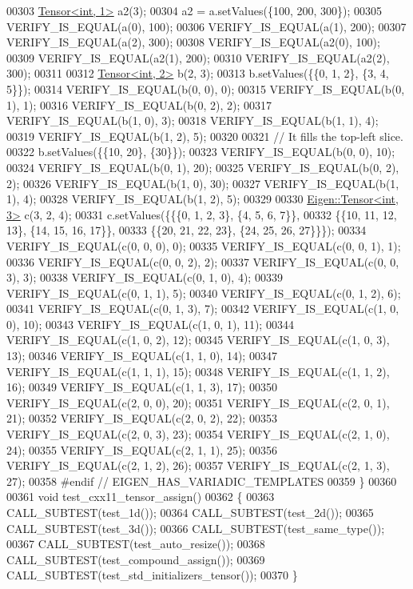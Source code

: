 \begin{DoxyCode}
00303   \hyperlink{class_eigen_1_1_tensor}{Tensor<int, 1>} a2(3);
00304   a2 = a.setValues(\{100, 200, 300\});
00305   VERIFY\_IS\_EQUAL(a(0), 100);
00306   VERIFY\_IS\_EQUAL(a(1), 200);
00307   VERIFY\_IS\_EQUAL(a(2), 300);
00308   VERIFY\_IS\_EQUAL(a2(0), 100);
00309   VERIFY\_IS\_EQUAL(a2(1), 200);
00310   VERIFY\_IS\_EQUAL(a2(2), 300);
00311 
00312   \hyperlink{class_eigen_1_1_tensor}{Tensor<int, 2>} b(2, 3);
00313   b.setValues(\{\{0, 1, 2\}, \{3, 4, 5\}\});
00314   VERIFY\_IS\_EQUAL(b(0, 0), 0);
00315   VERIFY\_IS\_EQUAL(b(0, 1), 1);
00316   VERIFY\_IS\_EQUAL(b(0, 2), 2);
00317   VERIFY\_IS\_EQUAL(b(1, 0), 3);
00318   VERIFY\_IS\_EQUAL(b(1, 1), 4);
00319   VERIFY\_IS\_EQUAL(b(1, 2), 5);
00320 
00321   \textcolor{comment}{// It fills the top-left slice.}
00322   b.setValues(\{\{10, 20\}, \{30\}\});
00323   VERIFY\_IS\_EQUAL(b(0, 0), 10);
00324   VERIFY\_IS\_EQUAL(b(0, 1), 20);
00325   VERIFY\_IS\_EQUAL(b(0, 2), 2);
00326   VERIFY\_IS\_EQUAL(b(1, 0), 30);
00327   VERIFY\_IS\_EQUAL(b(1, 1), 4);
00328   VERIFY\_IS\_EQUAL(b(1, 2), 5);
00329 
00330   \hyperlink{class_eigen_1_1_tensor}{Eigen::Tensor<int, 3>} c(3, 2, 4);
00331   c.setValues(\{\{\{0, 1, 2, 3\}, \{4, 5, 6, 7\}\},
00332                \{\{10, 11, 12, 13\}, \{14, 15, 16, 17\}\},
00333                \{\{20, 21, 22, 23\}, \{24, 25, 26, 27\}\}\});
00334   VERIFY\_IS\_EQUAL(c(0, 0, 0), 0);
00335   VERIFY\_IS\_EQUAL(c(0, 0, 1), 1);
00336   VERIFY\_IS\_EQUAL(c(0, 0, 2), 2);
00337   VERIFY\_IS\_EQUAL(c(0, 0, 3), 3);
00338   VERIFY\_IS\_EQUAL(c(0, 1, 0), 4);
00339   VERIFY\_IS\_EQUAL(c(0, 1, 1), 5);
00340   VERIFY\_IS\_EQUAL(c(0, 1, 2), 6);
00341   VERIFY\_IS\_EQUAL(c(0, 1, 3), 7);
00342   VERIFY\_IS\_EQUAL(c(1, 0, 0), 10);
00343   VERIFY\_IS\_EQUAL(c(1, 0, 1), 11);
00344   VERIFY\_IS\_EQUAL(c(1, 0, 2), 12);
00345   VERIFY\_IS\_EQUAL(c(1, 0, 3), 13);
00346   VERIFY\_IS\_EQUAL(c(1, 1, 0), 14);
00347   VERIFY\_IS\_EQUAL(c(1, 1, 1), 15);
00348   VERIFY\_IS\_EQUAL(c(1, 1, 2), 16);
00349   VERIFY\_IS\_EQUAL(c(1, 1, 3), 17);
00350   VERIFY\_IS\_EQUAL(c(2, 0, 0), 20);
00351   VERIFY\_IS\_EQUAL(c(2, 0, 1), 21);
00352   VERIFY\_IS\_EQUAL(c(2, 0, 2), 22);
00353   VERIFY\_IS\_EQUAL(c(2, 0, 3), 23);
00354   VERIFY\_IS\_EQUAL(c(2, 1, 0), 24);
00355   VERIFY\_IS\_EQUAL(c(2, 1, 1), 25);
00356   VERIFY\_IS\_EQUAL(c(2, 1, 2), 26);
00357   VERIFY\_IS\_EQUAL(c(2, 1, 3), 27);
00358 \textcolor{preprocessor}{#endif  // EIGEN\_HAS\_VARIADIC\_TEMPLATES}
00359 \}
00360 
00361 \textcolor{keywordtype}{void} test\_cxx11\_tensor\_assign()
00362 \{
00363   CALL\_SUBTEST(test\_1d());
00364   CALL\_SUBTEST(test\_2d());
00365   CALL\_SUBTEST(test\_3d());
00366   CALL\_SUBTEST(test\_same\_type());
00367   CALL\_SUBTEST(test\_auto\_resize());
00368   CALL\_SUBTEST(test\_compound\_assign());
00369   CALL\_SUBTEST(test\_std\_initializers\_tensor());
00370 \}
\end{DoxyCode}
